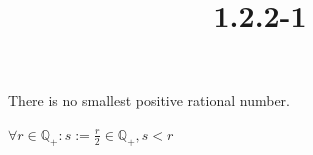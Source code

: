 \documentclass{article}
\title{1.2.2-1}
\begin{document}
\maketitle

There is no smallest positive rational number.

$\forall r \in \mathbb{Q}_+: s := \frac{r}{2} \in \mathbb{Q}_+, s < r$
\end{document}
